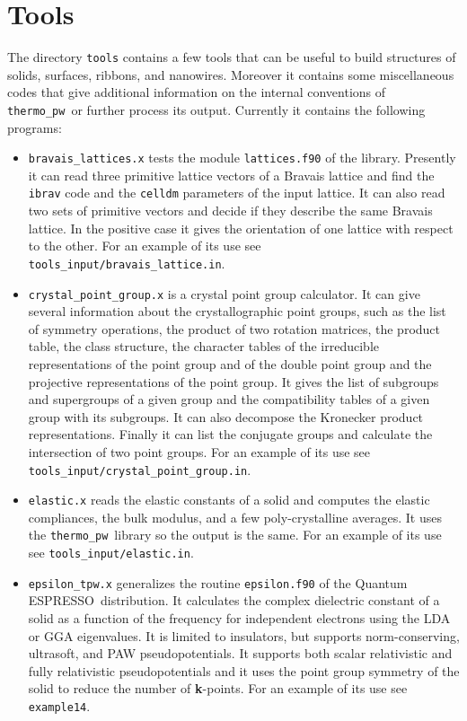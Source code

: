 \documentclass[12pt,a4paper]{article}
\def\qe{{\sc Quantum ESPRESSO}}
\def\thermo{\texttt{thermo\_pw}}
\begin{document}
\newpage
\section{\color{coral}Tools}

The directory \texttt{tools} contains a few tools that can be useful to build
structures of solids, surfaces, ribbons, and nanowires. Moreover it 
contains some miscellaneous codes that give additional information
on the internal conventions of \thermo\ or further process its output. 
Currently it contains the following programs:

\begin{itemize}

\item \texttt{bravais\_lattices.x} tests the
module \texttt{lattices.f90} of the library. Presently it can read three
primitive lattice vectors of a Bravais lattice and find the \texttt{ibrav}
code and the \texttt{celldm} parameters of the input lattice. It
can also read two sets of primitive vectors and decide if they describe
the same Bravais lattice. In the positive case it gives the orientation
of one lattice with respect to the other.
For an example of its use see \texttt{tools\_input/bravais\_lattice.in}.

\item \texttt{crystal\_point\_group.x} is a crystal point group calculator.
It can give several information about the crystallographic point groups,
such as the list of symmetry operations, the product of two rotation
matrices, the product table, the class structure, the character tables of 
the irreducible representations of the point group and of the double
point group and the projective representations of the point group. It
gives the list of subgroups and supergroups of a given group and 
the compatibility tables of a given group with its subgroups. It can 
also decompose the Kronecker product representations. Finally it
can list the conjugate groups and calculate the intersection of two
point groups.
For an example of its use see \texttt{tools\_input/crystal\_point\_group.in}.

\item \texttt{elastic.x} reads the elastic constants of a
solid and computes the elastic compliances, the bulk modulus, and a few
poly-crystalline averages. It uses the \thermo\ library so the output is the
same. 
For an example of its use see \texttt{tools\_input/elastic.in}.

\item \texttt{epsilon\_tpw.x} generalizes the routine
\texttt{epsilon.f90} of the \qe\ distribution. It calculates the 
complex dielectric
constant of a solid as a function of the frequency for independent electrons
using the LDA or GGA eigenvalues. It is limited to insulators, but supports
norm-conserving, ultrasoft, and PAW pseudopotentials. It supports both scalar
relativistic and fully relativistic pseudopotentials and it uses the point
group symmetry of the solid to reduce the number of {\bf k}-points.
For an example of its use see \texttt{example14}.


\end{itemize}
\end{document}
